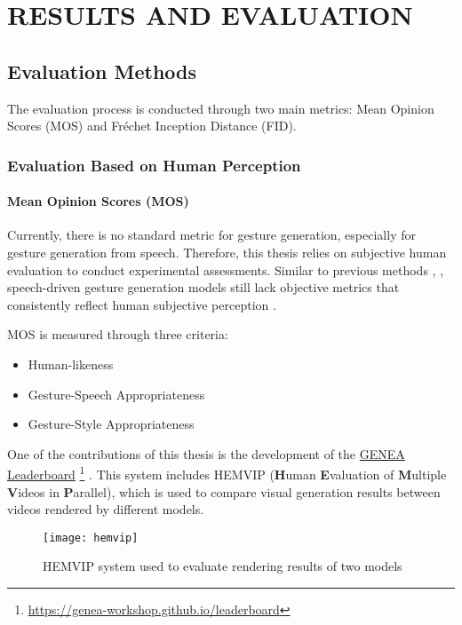 \chapter{RESULTS AND EVALUATION}
\label{chap:evalution}

\section{Evaluation Methods}

The evaluation process is conducted through two main metrics: Mean Opinion Scores (MOS) and Fréchet Inception Distance (FID).

\subsection{Evaluation Based on Human Perception}

\subsubsection{Mean Opinion Scores (MOS)}

Currently, there is no standard metric for gesture generation, especially for gesture generation from speech. Therefore, this thesis relies on subjective human evaluation to conduct experimental assessments. 
Similar to previous methods \cite{yoon2022genea}, \cite{kucherenko2021large}, speech-driven gesture generation models still lack objective metrics that consistently reflect human subjective perception \cite{alexanderson2022listen}.

MOS is measured through three criteria:

\begin{itemize}
	\item Human-likeness
	\item Gesture-Speech Appropriateness
	\item Gesture-Style Appropriateness
\end{itemize}

One of the contributions of this thesis is the development of the \hyperlink{https://genea-workshop.github.io/leaderboard/}{GENEA Leaderboard} \footnote{ \url{https://genea-workshop.github.io/leaderboard} } \cite{nagy2024towards}. This system includes HEMVIP (\textbf{H}uman \textbf{E}valuation of \textbf{M}ultiple \textbf{V}ideos in \textbf{P}arallel), which is used to compare visual generation results between videos rendered by different models.

\begin{figure}[h]
	\centering
	\texttt{[image: hemvip]}
	\caption{HEMVIP system used to evaluate rendering results of two models}
\end{figure}

